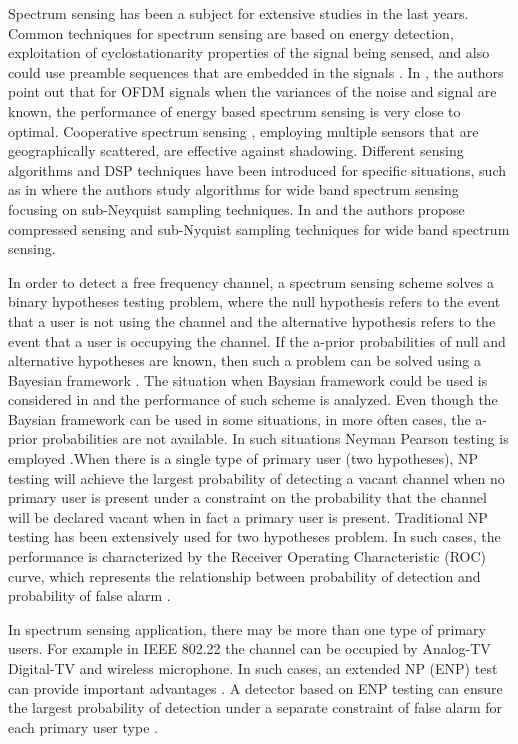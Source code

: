 \documentclass[12pt,journal,a4paper,twoside,onecolumn]{IEEEtran}
\begin{document}
\begin{spacing}{2}
 Spectrum sensing has been a subject for extensive studies in the last years\cite{axell2012spectrum}. Common techniques for spectrum sensing are based on energy detection, exploitation of cyclostationarity properties of  the signal being sensed, and also could use preamble sequences that are embedded in the signals \cite{cabric2004implementation}.  In \cite{axell2011optimal}, the authors point out that for OFDM signals when the variances of the noise and signal are known, the performance of energy based spectrum sensing is very close to optimal. Cooperative spectrum sensing \cite{ganesan2005cooperative}, employing multiple sensors that are geographically scattered, are effective against shadowing.
Different sensing algorithms and DSP techniques have been introduced for specific situations, such as in \cite{tian2007compressed} where the authors study algorithms for wide band spectrum sensing focusing on sub-Neyquist sampling techniques. In  \cite{sun2013wideband} and  \cite{sun2013wideband2} the authors propose compressed sensing and sub-Nyquist sampling techniques for wide band spectrum sensing.

In order to detect a free frequency channel, a spectrum sensing scheme solves a binary hypotheses testing problem, where the null hypothesis refers to the event that a user is not using the channel and the alternative hypothesis refers to the event that a user is occupying the channel. If the a-prior probabilities of null and alternative hypotheses are known, then such a problem can be solved using a Bayesian framework \cite{poor1994introduction}. The situation when Baysian framework could be used is considered in \cite{zeng2010review} and the performance of such scheme is analyzed.
Even though the Baysian framework can be used in some situations, in more often cases, the a-prior probabilities are not available. In such situations Neyman Pearson testing is employed \cite{poor1994introduction}.When there is a single type of primary user (two hypotheses), NP testing will achieve the largest probability of detecting a vacant channel when no primary user is present under a constraint on the probability that the channel will be declared vacant when in fact a primary user is present.
Traditional NP testing has been extensively used for two hypotheses problem. In such cases,  the performance is characterized by the Receiver Operating Characteristic (ROC) curve, which represents the relationship between probability of detection and probability of false alarm \cite{poor1994introduction}.

In spectrum sensing application, there may be more than one type of primary users. For example in IEEE 802.22 \cite{shellhammer2008spectrum} the channel can be occupied by Analog-TV Digital-TV and wireless microphone. In such cases, an extended NP (ENP) test can provide important advantages \cite{zhang1999design}. A detector based on ENP testing can ensure the largest probability of detection under a separate constraint of false alarm for each primary user type \cite{LehmannTest}.


\end{spacing}
\end{document}
